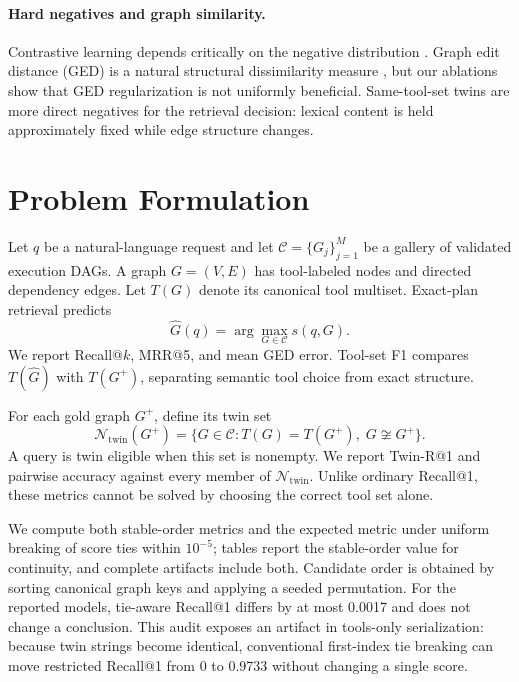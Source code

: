 \documentclass{article}
\makeatletter
\newcommand{\twR}{Twin-R@1}
\makeatother
\begin{document}
\paragraph{Hard negatives and graph similarity.}
Contrastive learning depends critically on the negative distribution \cite{oord2018representation,chen2020simple,you2020graph}.
Graph edit distance (GED) is a natural structural dissimilarity measure \cite{sanfeliu1983distance,abu2015exact}, but our ablations show that GED regularization is not uniformly beneficial.
Same-tool-set twins are more direct negatives for the retrieval decision: lexical content is held approximately fixed while edge structure changes.

\section{Problem Formulation}

Let $q$ be a natural-language request and let $\mathcal{C}=\{G_j\}_{j=1}^{M}$ be a gallery of validated execution DAGs.
A graph $G=(V,E)$ has tool-labeled nodes and directed dependency edges.
Let $T(G)$ denote its canonical tool multiset.
Exact-plan retrieval predicts
\begin{equation}
    \hat G(q)=\arg\max_{G\in\mathcal C}s(q,G).
\end{equation}
We report Recall@$k$, MRR@5, and mean GED error.
Tool-set F1 compares $T(\hat G)$ with $T(G^+)$, separating semantic tool choice from exact structure.

For each gold graph $G^+$, define its twin set
\begin{equation}
    \mathcal N_{\mathrm{twin}}(G^+)=
    \{G\in\mathcal C:T(G)=T(G^+),\;G\not\cong G^+\}.
\end{equation}
A query is twin eligible when this set is nonempty.
We report \twR{} and pairwise accuracy against every member of $\mathcal N_{\mathrm{twin}}$.
Unlike ordinary Recall@1, these metrics cannot be solved by choosing the correct tool set alone.

We compute both stable-order metrics and the expected metric under uniform breaking of score ties within $10^{-5}$; tables report the stable-order value for continuity, and complete artifacts include both.
Candidate order is obtained by sorting canonical graph keys and applying a seeded permutation.
For the reported models, tie-aware Recall@1 differs by at most 0.0017 and does not change a conclusion.
This audit exposes an artifact in tools-only serialization: because twin strings become identical, conventional first-index tie breaking can move restricted Recall@1 from 0 to 0.9733 without changing a single score.
\end{document}
